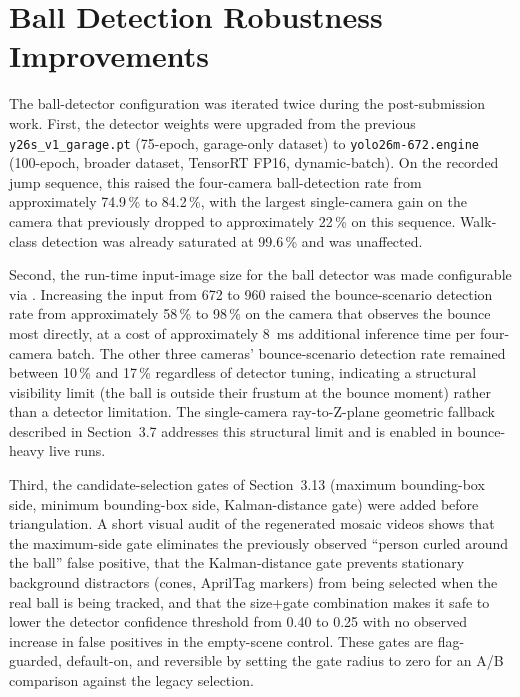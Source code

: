 
\section{Ball Detection Robustness Improvements}
\label{sec:5_ball_robustness}

The ball-detector configuration was iterated twice during the post-submission work. First, the detector weights were upgraded from the previous \texttt{y26s\_v1\_garage.pt} (75-epoch, garage-only dataset) to \texttt{yolo26m-672.engine} (100-epoch, broader dataset, TensorRT FP16, dynamic-batch). On the recorded jump sequence, this raised the four-camera ball-detection rate from approximately 74.9\,\% to 84.2\,\%, with the largest single-camera gain on the camera that previously dropped to approximately 22\,\% on this sequence. Walk-class detection was already saturated at 99.6\,\% and was unaffected.

Second, the run-time input-image size for the ball detector was made configurable via \texttt{}. Increasing the input from 672 to 960 raised the bounce-scenario detection rate from approximately 58\,\% to 98\,\% on the camera that observes the bounce most directly, at a cost of approximately 8~ms additional inference time per four-camera batch. The other three cameras' bounce-scenario detection rate remained between 10\,\% and 17\,\% regardless of detector tuning, indicating a structural visibility limit (the ball is outside their frustum at the bounce moment) rather than a detector limitation. The single-camera ray-to-Z-plane geometric fallback described in Section~3.7 addresses this structural limit and is enabled in bounce-heavy live runs.

Third, the candidate-selection gates of Section~3.13 (maximum bounding-box side, minimum bounding-box side, Kalman-distance gate) were added before triangulation. A short visual audit of the regenerated mosaic videos shows that the maximum-side gate eliminates the previously observed ``person curled around the ball'' false positive, that the Kalman-distance gate prevents stationary background distractors (cones, AprilTag markers) from being selected when the real ball is being tracked, and that the size+gate combination makes it safe to lower the detector confidence threshold from 0.40 to 0.25 with no observed increase in false positives in the empty-scene control. These gates are flag-guarded, default-on, and reversible by setting the gate radius to zero for an A/B comparison against the legacy selection.

